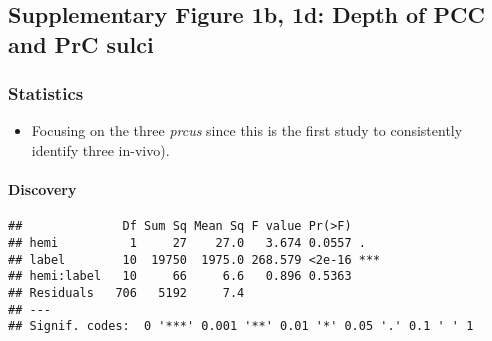 \documentclass[
]{article}
\newenvironment{Shaded}{\begin{snugshade}}{\end{snugshade}}
\newcommand{\CommentTok}[1]{\textcolor[rgb]{0.56,0.35,0.01}{\textit{#1}}}
\newcommand{\DecValTok}[1]{\textcolor[rgb]{0.00,0.00,0.81}{#1}}
\newcommand{\KeywordTok}[1]{\textcolor[rgb]{0.13,0.29,0.53}{\textbf{#1}}}
\newcommand{\NormalTok}[1]{#1}
\newcommand{\OperatorTok}[1]{\textcolor[rgb]{0.81,0.36,0.00}{\textbf{#1}}}
\newcommand{\StringTok}[1]{\textcolor[rgb]{0.31,0.60,0.02}{#1}}
\providecommand{\tightlist}{%
  \setlength{\itemsep}{0pt}\setlength{\parskip}{0pt}}
\begin{document}
\hypertarget{supplementary-figure-1b-1d-depth-of-pcc-and-prc-sulci}{%
\subsection{Supplementary Figure 1b, 1d: Depth of PCC and PrC
sulci}\label{supplementary-figure-1b-1d-depth-of-pcc-and-prc-sulci}}

\hypertarget{statistics}{%
\subsubsection{Statistics}\label{statistics}}

\begin{itemize}
\tightlist
\item
  Focusing on the three \emph{prcus} since this is the first study to
  consistently identify three in-vivo).
\end{itemize}

\hypertarget{discovery}{%
\paragraph{Discovery}\label{discovery}}

\begin{Shaded}
\end{Shaded}

\begin{verbatim}
##              Df Sum Sq Mean Sq F value Pr(>F)    
## hemi          1     27    27.0   3.674 0.0557 .  
## label        10  19750  1975.0 268.579 <2e-16 ***
## hemi:label   10     66     6.6   0.896 0.5363    
## Residuals   706   5192     7.4                   
## ---
## Signif. codes:  0 '***' 0.001 '**' 0.01 '*' 0.05 '.' 0.1 ' ' 1
\end{verbatim}
\end{document}

